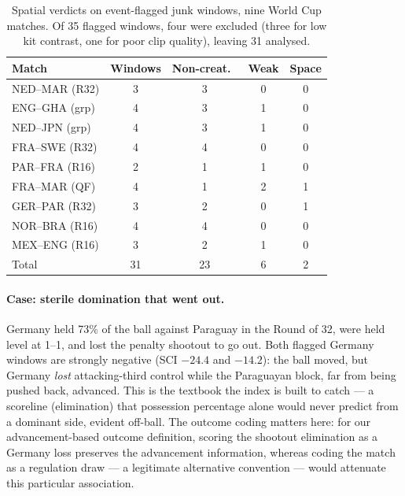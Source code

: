 \documentclass[11pt]{article}
\begin{document}
\begin{table}[t]
\centering
\small
\begin{tabular}{lcccc}
\toprule
Match & Windows & Non-creat.\ & Weak & Space \\
\midrule
NED--MAR (R32) & 3 & 3 & 0 & 0 \\
ENG--GHA (grp) & 4 & 3 & 1 & 0 \\
NED--JPN (grp) & 4 & 3 & 1 & 0 \\
FRA--SWE (R32) & 4 & 4 & 0 & 0 \\
PAR--FRA (R16) & 2 & 1 & 1 & 0 \\
FRA--MAR (QF)  & 4 & 1 & 2 & 1 \\
GER--PAR (R32) & 3 & 2 & 0 & 1 \\
NOR--BRA (R16) & 4 & 4 & 0 & 0 \\
MEX--ENG (R16) & 3 & 2 & 1 & 0 \\
\midrule
Total          & 31 & 23 & 6 & 2 \\
\bottomrule
\end{tabular}
\caption{Spatial verdicts on event-flagged junk windows, nine World Cup
matches. Of 35 flagged windows, four were excluded (three for low kit contrast,
one for poor clip quality), leaving 31 analysed.}
\label{tab:agg}
\end{table}

\paragraph{Case: sterile domination that went out.} Germany held 73\% of the
ball against Paraguay in the Round of 32, were held level at 1--1, and lost the
penalty shootout to go out. Both flagged Germany windows are strongly negative
(SCI $-24.4$ and $-14.2$): the ball moved, but Germany \emph{lost}
attacking-third control while the Paraguayan block, far from being pushed back,
advanced. This is the textbook
the index is built to catch --- a scoreline (elimination) that possession
percentage alone would never predict from a dominant side, evident
off-ball. The outcome coding matters here: for our advancement-based outcome
definition, scoring the shootout elimination as a Germany loss preserves the
advancement information, whereas coding the match as a regulation draw --- a
legitimate alternative convention --- would attenuate this particular
association.
\end{document}
